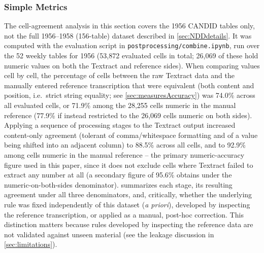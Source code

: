 \documentclass[12pt]{article}
\begin{document}
\subsubsection{Simple Metrics}\label{sec:simple}
The cell-agreement analysis in this section covers the 1956 CANDID tables only, not the full 1956--1958 (156-table) dataset described in \cref{sec:NDDdetails}. It was computed with the evaluation script in \texttt{postprocessing/combine.ipynb}, run over the 52 weekly tables for 1956 (53{,}872 evaluated cells in total; 26{,}069 of these hold numeric values on both the Textract and reference sides). When comparing values cell by cell, the percentage of cells between the raw Textract data and the manually entered reference transcription that were equivalent (both content and position, i.e.\ strict string equality; see \cref{sec:measuresAccuracy}) was 74.0\% across all evaluated cells, or 71.9\% among the 28{,}255 cells numeric in the manual reference (77.9\% if instead restricted to the 26{,}069 cells numeric on both sides). Applying a sequence of processing stages to the Textract output increased content-only agreement (tolerant of comma/whitespace formatting and of a value being shifted into an adjacent column) to 88.5\% across all cells, and to 92.9\% among cells numeric in the manual reference -- the primary numeric-accuracy figure used in this paper, since it does not exclude cells where Textract failed to extract any number at all (a secondary figure of 95.6\% obtains under the numeric-on-both-sides denominator).  summarizes each stage, its resulting agreement under all three denominators, and, critically, whether the underlying rule was fixed independently of this dataset (\emph{a priori}), developed by inspecting the reference transcription, or applied as a manual, post-hoc correction. This distinction matters because rules developed by inspecting the reference data are not validated against unseen material (see the leakage discussion in \cref{sec:limitations}).
\end{document}
